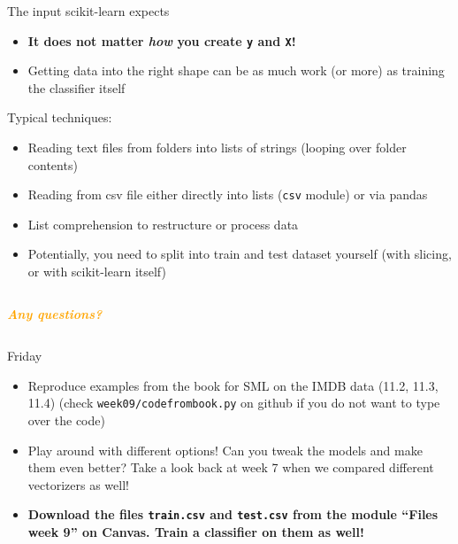 \documentclass[compress]{beamer}
\newcommand{\question}[1]{
	\begin{frame}[plain]
		\begin{columns}
			\column{.3\textwidth}
			\makebox[\columnwidth]{
				\texttt{[image: mannetje.png]}}
			\column{.7\textwidth}
			\large
			\textcolor{orange}{\textbf{\emph{#1}}}
		\end{columns}
\end{frame}}
\begin{document}
\begin{frame}{The input scikit-learn expects}
\begin{itemize}
	\item \textbf{It does not matter \emph{how} you create \texttt{y} and \texttt{X}!}
	\item Getting data into the right shape can be as much work (or more) as training the classifier itself
\end{itemize}
\pause
Typical techniques:
\begin{itemize}
	\item Reading text files from folders into lists of strings (looping over folder contents)
	\item Reading from csv file either directly into lists (\texttt{csv} module) or via pandas
	\item List comprehension to restructure or process data
	\item Potentially, you need to split into train and test dataset yourself (with slicing, or  with scikit-learn itself)
\end{itemize}


\end{frame}


\question{Any questions?}

\begin{frame}{Friday}
\begin{itemize}
	\item Reproduce examples from the book for SML on the IMDB data (11.2, 11.3, 11.4) (check \texttt{week09/codefrombook.py} on github if you do not want to type over the code)
	\item Play around with different options! Can you tweak the models and make them even better? Take a look back at week 7 when we compared different vectorizers as well!
	\item \textbf{Download the files \texttt{train.csv} and \texttt{test.csv} from the module ``Files week 9'' on Canvas. Train a classifier on them as well!} \parencite[Data from][]{Vermeer2020c}
\end{itemize}

\end{frame}

\begin{frame}
	\printbibliography
\end{frame}
\end{document}
